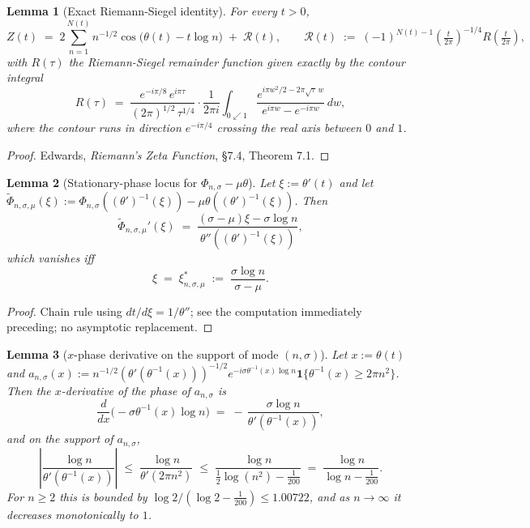\documentclass[11pt]{article}
\newtheorem{lemma}{Lemma}
\begin{document}
\begin{lemma}[Exact Riemann-Siegel identity]\label{lem:RS}
For every $t>0$,
\[
  Z(t) \;=\; 2\sum_{n=1}^{N(t)} n^{-1/2}\cos\!\bigl(\theta(t) - t\log n\bigr) \;+\; \mathcal{R}(t),
  \qquad
  \mathcal{R}(t) \;:=\; (-1)^{N(t)-1}\!\left(\tfrac{t}{2\pi}\right)^{-1/4}\!R\!\left(\tfrac{t}{2\pi}\right),
\]
with $R(\tau)$ the Riemann-Siegel remainder function given exactly by the contour integral
\[
  R(\tau) \;=\; \frac{e^{-i\pi/8}\,e^{i\pi\tau}}{(2\pi)^{1/2}\,\tau^{1/4}}\cdot\frac{1}{2\pi i}\int_{0\swarrow 1}\frac{e^{i\pi w^{2}/2 - 2\pi\sqrt{\tau}\,w}}{e^{i\pi w}-e^{-i\pi w}}\,dw,
\]
where the contour runs in direction $e^{-i\pi/4}$ crossing the real axis between $0$ and $1$.
\end{lemma}

\begin{proof}
Edwards, \emph{Riemann's Zeta Function}, \S7.4, Theorem 7.1.
\end{proof}

\begin{lemma}[Stationary-phase locus for $\Phi_{n,\sigma}-\mu\theta$]\label{lem:statlocus}
Let $\xi := \theta'(t)$ and let $\widetilde\Phi_{n,\sigma,\mu}(\xi) := \Phi_{n,\sigma}((\theta')^{-1}(\xi)) - \mu\theta((\theta')^{-1}(\xi))$. Then
\[
  \widetilde\Phi_{n,\sigma,\mu}'(\xi) \;=\; \frac{(\sigma-\mu)\xi - \sigma\log n}{\theta''((\theta')^{-1}(\xi))},
\]
which vanishes iff
\[
  \xi \;=\; \xi^{*}_{n,\sigma,\mu} \;:=\; \frac{\sigma\log n}{\sigma-\mu}.
\]
\end{lemma}

\begin{proof}
Chain rule using $dt/d\xi = 1/\theta''$; see the computation immediately preceding; no asymptotic replacement.
\end{proof}

\begin{lemma}[$x$-phase derivative on the support of mode $(n,\sigma)$]\label{lem:modefreq}
Let $x := \theta(t)$ and $a_{n,\sigma}(x) := n^{-1/2}(\theta'(\theta^{-1}(x)))^{-1/2} e^{-i\sigma\theta^{-1}(x)\log n}\mathbf{1}\{\theta^{-1}(x)\ge 2\pi n^{2}\}$. Then the $x$-derivative of the phase of $a_{n,\sigma}$ is
\[
  \frac{d}{dx}\bigl(-\sigma\theta^{-1}(x)\log n\bigr) \;=\; -\,\frac{\sigma\log n}{\theta'(\theta^{-1}(x))},
\]
and on the support of $a_{n,\sigma}$,
\[
  \left|\frac{\log n}{\theta'(\theta^{-1}(x))}\right| \;\le\; \frac{\log n}{\theta'(2\pi n^{2})}
  \;\le\; \frac{\log n}{\tfrac12\log(n^{2}) - \tfrac{1}{200}}
  \;=\; \frac{\log n}{\log n - \tfrac{1}{200}}.
\]
For $n\ge 2$ this is bounded by $\log 2/(\log 2 - \tfrac{1}{200}) \le 1.00722$, and as $n\to\infty$ it decreases monotonically to $1$.
\end{lemma}
\end{document}
